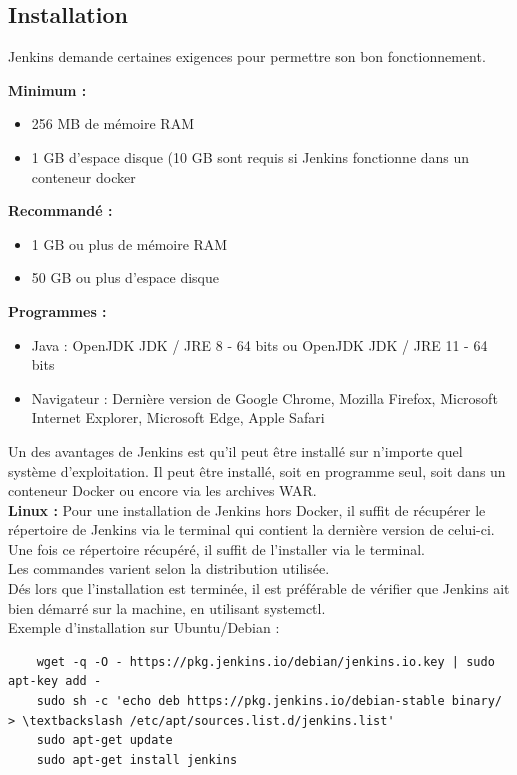 \documentclass[12pt]{article}
\begin{document}
\subsection{Installation}

Jenkins demande certaines exigences pour permettre son bon fonctionnement.
\\
\vspace{0.5cm}

\textbf{Minimum :}
\begin{itemize}
\item 256 MB de mémoire RAM
\item 1 GB d'espace disque (10 GB sont requis si Jenkins fonctionne dans un conteneur docker
\end{itemize}

\vspace{0.5cm}

\textbf{Recommandé :}
\begin{itemize}
\item 1 GB ou plus de mémoire RAM
\item 50 GB ou plus d'espace disque
\end{itemize}

\vspace{0.5cm}

\textbf{Programmes :}
\begin{itemize}
\item Java : OpenJDK JDK / JRE 8 - 64 bits ou OpenJDK JDK / JRE 11 - 64 bits
\item Navigateur : Dernière version de Google Chrome, Mozilla Firefox, Microsoft Internet Explorer, Microsoft Edge, Apple Safari
\end{itemize}

\vspace{0.5cm}
Un des avantages de Jenkins est qu'il peut être installé sur n'importe quel système d'exploitation. Il peut être installé, soit en programme seul, soit dans un conteneur Docker ou encore via les archives WAR.
\\
\textbf{Linux :}
Pour une installation de Jenkins hors Docker, il suffit de récupérer le répertoire de Jenkins via le terminal qui contient la dernière version de celui-ci. Une fois ce répertoire récupéré, il suffit de l'installer via le terminal.
\\
Les commandes varient selon la distribution utilisée.
\\
Dés lors que l'installation est terminée, il est préférable de vérifier que Jenkins ait bien démarré sur la machine, en utilisant systemctl.
\vspace{0.5cm}
\\
Exemple d'installation sur Ubuntu/Debian :
\begin{lstlisting}
    wget -q -O - https://pkg.jenkins.io/debian/jenkins.io.key | sudo apt-key add -
    sudo sh -c 'echo deb https://pkg.jenkins.io/debian-stable binary/ > \textbackslash /etc/apt/sources.list.d/jenkins.list'
    sudo apt-get update
    sudo apt-get install jenkins
\end{lstlisting}
\end{document}
